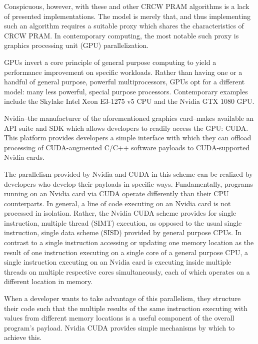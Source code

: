 \documentclass[letterpaper, 12pt]{article}
\begin{document}
  Conspicuous, however, with these and other CRCW PRAM algorithms is a lack of presented implementations.  The model is merely that, and thus implementing such an algorithm requires a suitable proxy which shares the characteristics of CRCW PRAM.  In contemporary computing, the most notable such proxy is graphics processing unit (GPU) parallelization.

  GPUs invert a core principle of general purpose computing to yield a performance improvement on specific workloads.  Rather than having one or a handful of general purpose, powerful multiprocessors, GPUs opt for a different model: many less powerful, special purpose processors.  Contemporary examples include the Skylake Intel Xeon E3-1275 v5 CPU and the Nvidia GTX 1080 GPU.

  Nvidia--the manufacturer of the aforementioned graphics card--makes available an API suite and SDK which allows developers to readily access the GPU: CUDA.  This platform provides developers a simple interface with which they can offload processing of CUDA-augmented C/C++ software payloads to CUDA-supported Nvidia cards.

  The parallelism provided by Nvidia and CUDA in this scheme can be realized by developers who develop their payloads in specific ways.  Fundamentally, programs running on an Nvidia card via CUDA operate differently than their  CPU counterparts.  In general, a line of code executing on an Nvidia card is not processed in isolation.  Rather, the Nvidia CUDA scheme provides for single instruction, multiple thread (SIMT) execution, as opposed to the usual single instruction, single data scheme (SISD) provided by general purpose CPUs.  In contrast to a single instruction accessing or updating one memory location as the result of one instruction executing on a single core of a general purpose CPU, a single instruction executing on an Nvidia card is executing inside multiple threads on multiple respective cores simultaneously, each of which operates on a different location in memory.

  When a developer wants to take advantage of this parallelism, they structure their code such that the multiple results of the same instruction executing with values from different memory locations is a useful component of the overall program's payload.  Nvidia CUDA provides simple mechanisms by which to achieve this.
\end{document}
